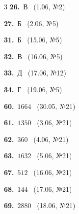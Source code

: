 \documentclass[12pt]{article}
\begin{document}
\ifshowsolutions
{}
\begin{multicols}{3}\noindent
\noindent\textbf{26.}~В \ {\scriptsize\color{gray}(1.06, №2)}\par
\noindent\textbf{27.}~Б \ {\scriptsize\color{gray}(2.06, №5)}\par
\noindent\textbf{31.}~Б \ {\scriptsize\color{gray}(15.06, №5)}\par
\noindent\textbf{32.}~В \ {\scriptsize\color{gray}(16.06, №5)}\par
\noindent\textbf{33.}~Д \ {\scriptsize\color{gray}(17.06, №12)}\par
\noindent\textbf{34.}~Г \ {\scriptsize\color{gray}(19.06, №5)}\par
\noindent\textbf{60.}~$1664$ \ {\scriptsize\color{gray}(30.05, №21)}\par
\noindent\textbf{61.}~$1350$ \ {\scriptsize\color{gray}(3.06, №21)}\par
\noindent\textbf{62.}~$360$ \ {\scriptsize\color{gray}(4.06, №21)}\par
\noindent\textbf{63.}~$1632$ \ {\scriptsize\color{gray}(5.06, №21)}\par
\noindent\textbf{67.}~$512$ \ {\scriptsize\color{gray}(16.06, №21)}\par
\noindent\textbf{68.}~$144$ \ {\scriptsize\color{gray}(17.06, №21)}\par
\noindent\textbf{69.}~$2880$ \ {\scriptsize\color{gray}(18.06, №21)}\par
\end{multicols}
\fi

\endgroup
\end{document}
